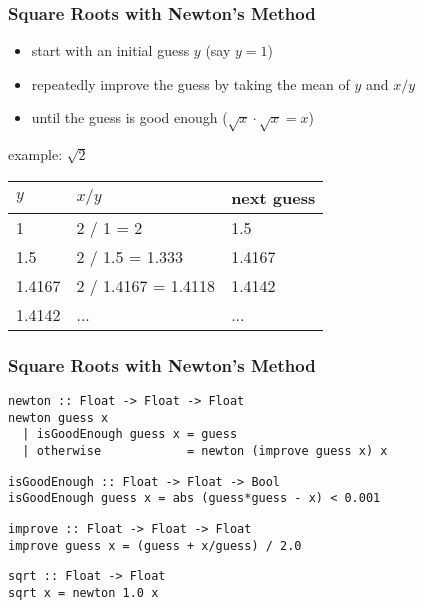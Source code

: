 \documentclass[dvipsnames]{beamer}
\theoremstyle{plain}
\begin{document}
\begin{frame}
  \frametitle{Square Roots with Newton's Method}

  \begin{itemize}
    \item start with an initial guess $y$ (say $y = 1$)
    \item repeatedly improve the guess by taking the mean of $y$
      and $x / y$
    \item until the guess is good enough ($\sqrt x \cdot \sqrt x = x$)
  \end{itemize}

  \medskip
  \begin{exampleblock}{example: $\sqrt{2}$}
    \begin{center}
      \begin{tabular}{lll}
      $y$      & $x / y$             & next guess\\\hline
      1        & 2 / 1 = 2           & 1.5\\
      1.5      & 2 / 1.5 = 1.333     & 1.4167\\
      1.4167   & 2 / 1.4167 = 1.4118 & 1.4142\\
      1.4142   & ...                 & ...
      \end{tabular}
    \end{center}
  \end{exampleblock}
\end{frame}

\begin{frame}[fragile]
  \frametitle{Square Roots with Newton's Method}

  \begin{lstlisting}
newton :: Float -> Float -> Float
newton guess x
  | isGoodEnough guess x = guess
  | otherwise            = newton (improve guess x) x
  \end{lstlisting}

  \pause
  \begin{lstlisting}
isGoodEnough :: Float -> Float -> Bool
isGoodEnough guess x = abs (guess*guess - x) < 0.001
  \end{lstlisting}

  \pause
  \begin{lstlisting}
improve :: Float -> Float -> Float
improve guess x = (guess + x/guess) / 2.0
  \end{lstlisting}

  \pause
  \begin{lstlisting}
sqrt :: Float -> Float
sqrt x = newton 1.0 x
  \end{lstlisting}
\end{frame}
\end{document}
